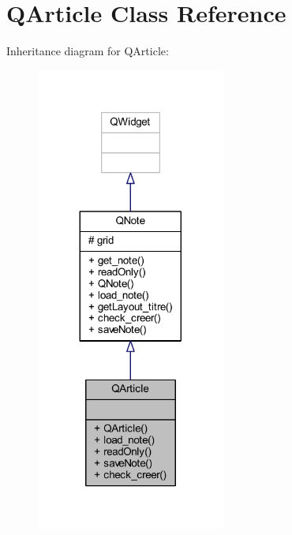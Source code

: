 \hypertarget{class_q_article}{}\section{Q\+Article Class Reference}
\label{class_q_article}


Inheritance diagram for Q\+Article\+:
\nopagebreak
\begin{figure}[H]
\begin{center}
\leavevmode
\includegraphics[width=176pt]{class_q_article__inherit__graph}
\end{center}
\end{figure}


